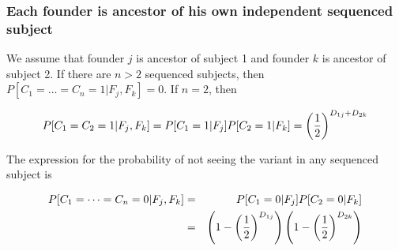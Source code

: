 \documentclass[12pt]{aastex}
\begin{document}
\subsubsection{Each founder is ancestor of his own independent sequenced subject}

We assume that founder $j$ is ancestor of subject 1 and founder $k$ is ancestor of subject 2. If there are $n>2$ sequenced subjects, then $P[C_1 = \dots = C_n = 1 | F_j, F_k] = 0$. If $n=2$, then

\begin{equation}
P[C_1 = C_2 = 1 | F_j, F_k] = P[C_1 = 1 | F_j] P[C_2 = 1 | F_k] = \left(1 \over 2 \right)^{D_{1j} + D_{2k}}
\end{equation}

The expression for the probability of not seeing the variant in any sequenced subject is

\begin{eqnarray}
P[C_1 = \dots = C_n = 0 | F_j, F_k] &=& P[C_1 = 0 | F_j] P[C_2 = 0 | F_k]\\
&=& \left(1 - \left(1 \over 2 \right)^{D_{1j}} \right) \left(1 - \left(1 \over 2 \right)^{D_{2k}} \right)\nonumber
\end{eqnarray}
\end{document}
